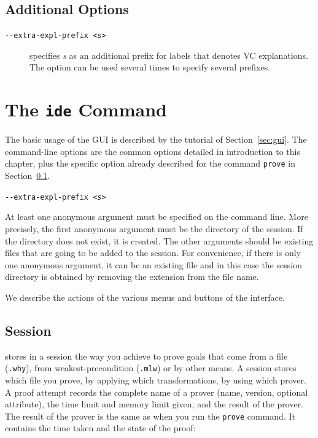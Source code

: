 \subsection{Additional Options}
\label{sec:proveoptions}

\begin{description}
\item[\texttt{-{}-extra-expl-prefix \textsl{<s>}}] specifies
  \textsl{s} as an additional prefix for labels that denotes VC
  explanations. The option can be used several times to specify
  several prefixes.
\end{description}

\section{The \texttt{ide} Command}
\label{sec:ideref}

The basic usage of the GUI is described by the tutorial of
Section~\ref{sec:gui}. The command-line options are the common options
detailed in introduction to this chapter, plus the specific option
already described for the command \texttt{prove} in
Section~\ref{sec:proveoptions}.
\begin{description}
\item[\texttt{-{}-extra-expl-prefix \textsl{<s>}}]
\end{description}
At least one anonymous argument must be specified on the command
line. More precisely, the first anonymous argument must be the
directory of the session. If the directory does not exist, it is
created. The other arguments should be existing files that are going
to be added to the session. For convenience, if there is only one
anonymous argument, it can be an existing file and in this case the
session directory is obtained by removing the extension from the file
name.

We describe the actions of the various menus and buttons of the
interface.

\subsection{Session}
\label{sec:idref:session}
\why stores in a session the way you achieve to prove goals that come
from a file (\texttt{.why}), from weakest-precondition (\texttt{.mlw}) or by other
means. A session stores which file you prove, by applying which
transformations, by using which prover. A proof attempt records the
complete name of a prover (name, version, optional attribute), the
time limit and memory limit given, and the result of the prover. The
result of the prover is the same as when you run the \texttt{prove} command. It
contains the time taken and the state of the proof:


